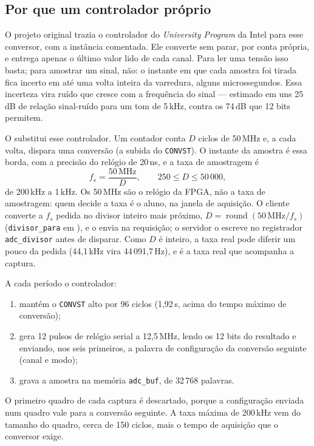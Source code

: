 \subsection{Por que um controlador próprio}

O projeto original trazia o controlador do \emph{University Program} da Intel
para esse conversor, com a instância comentada. Ele converte sem parar, por
conta própria, e entrega apenas o último valor lido de cada canal. Para ler uma
tensão isso basta; para amostrar um sinal, não: o instante em que cada amostra
foi tirada fica incerto em até uma volta inteira da varredura, alguns
microssegundos. Essa incerteza vira ruído que cresce com a frequência do sinal
--- estimado em uns 25\,dB de relação sinal-ruído para um tom de 5\,kHz, contra
os 74\,dB que 12 bits permitem.

O  substitui esse controlador. Um contador conta
\(D\) ciclos de 50\,MHz e, a cada volta, dispara uma conversão (a subida do
\texttt{CONVST}). O instante da amostra é essa borda, com a precisão do relógio
de 20\,ns, e a taxa de amostragem é
\[
  f_s = \frac{50\,\text{MHz}}{D}, \qquad 250 \le D \le 50\,000,
\]
de 200\,kHz a 1\,kHz. Os 50\,MHz são o relógio da FPGA, não a taxa de
amostragem: quem decide a taxa é o aluno, na janela de aquisição. O cliente
converte a \(f_s\) pedida no divisor inteiro mais próximo,
\(D = \operatorname{round}(50\,\text{MHz}/f_s)\)
(\texttt{divisor\_para} em ), e o envia na
requisição; o servidor o escreve no registrador \texttt{adc\_divisor} antes de
disparar. Como \(D\) é inteiro, a taxa real pode diferir um pouco da pedida
(44,1\,kHz vira 44\,091,7\,Hz), e é a taxa real que acompanha a captura.

A cada período o controlador:

\begin{enumerate}
  \item mantém o \texttt{CONVST} alto por 96 ciclos (1,92\,\textmu s, acima do
    tempo máximo de conversão);
  \item gera 12 pulsos de relógio serial a 12,5\,MHz, lendo os 12 bits do
    resultado e enviando, nos seis primeiros, a palavra de configuração da
    conversão seguinte (canal e modo);
  \item grava a amostra na memória \texttt{adc\_buf}, de 32\,768 palavras.
\end{enumerate}

O primeiro quadro de cada captura é descartado, porque a configuração enviada
num quadro vale para a conversão seguinte. A taxa máxima de 200\,kHz vem do
tamanho do quadro, cerca de 150 ciclos, mais o tempo de aquisição que o
conversor exige.

